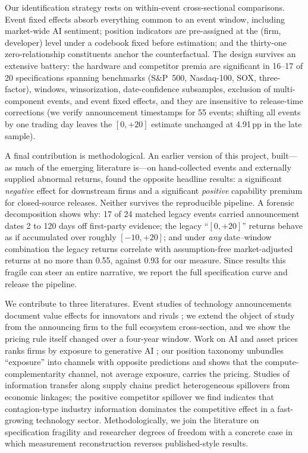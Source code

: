 \documentclass[review,12pt,authoryear]{elsarticle}
\newcommand{\pp}{\,pp}
\begin{document}
Our identification strategy rests on within-event cross-sectional comparisons.
Event fixed effects absorb everything common to an event window, including
market-wide AI sentiment; position indicators are pre-assigned at the
(firm, developer) level under a codebook fixed before estimation; and the
thirty-one zero-relationship constituents anchor the counterfactual. The
design survives an extensive battery: the hardware and competitor premia are
significant in 16--17 of 20 specifications spanning benchmarks (S\&P~500,
Nasdaq-100, SOX, three-factor), windows, winsorization, date-confidence
subsamples, exclusion of multi-component events, and event fixed effects, and
they are insensitive to release-time corrections (we verify announcement
timestamps for 55 events; shifting all events by one trading day leaves the
$[0,+20]$ estimate unchanged at 4.91\pp{} in the late sample).

A final contribution is methodological. An earlier version of this project,
built---as much of the emerging literature is---on hand-collected events and
externally supplied abnormal returns, found the opposite headline results: a
significant \emph{negative} effect for downstream firms and a significant
\emph{positive} capability premium for closed-source releases. Neither
survives the reproducible pipeline. A forensic decomposition shows why: 17 of
24 matched legacy events carried announcement dates 2 to 120 days off
first-party evidence; the legacy ``$[0,+20]$'' returns behave as if accumulated
over roughly $[-10,+20]$; and under \emph{any} date--window combination the
legacy returns correlate with assumption-free market-adjusted returns at no
more than 0.55, against 0.93 for our measure. Since results this fragile can
steer an entire narrative, we report the full specification curve and release
the pipeline.

We contribute to three literatures. Event studies of technology announcements
document value effects for innovators and rivals
\citep{chaney1991,chen2005,kogan2017}; we extend the object of study from the
announcing firm to the full ecosystem cross-section, and we show the pricing
rule itself changed over a four-year window. Work on AI and asset prices ranks
firms by exposure to generative AI \citep{eisfeldt2023,babina2024}; our
position taxonomy unbundles ``exposure'' into channels with opposite
predictions and shows that the compute-complementarity channel, not average
exposure, carries the pricing. Studies of information transfer along supply
chains \citep{lang1992,cohen2008,gofman2020,barrot2016} predict heterogeneous
spillovers from economic linkages; the positive competitor spillover we find
indicates that contagion-type industry information dominates the competitive
effect \citep{lang1992} in a fast-growing technology sector. Methodologically,
we join the literature on specification fragility and researcher degrees of
freedom \citep{simonsohn2020,brodeur2020,mitton2022} with a concrete case in
which measurement reconstruction reverses published-style results.
\end{document}
